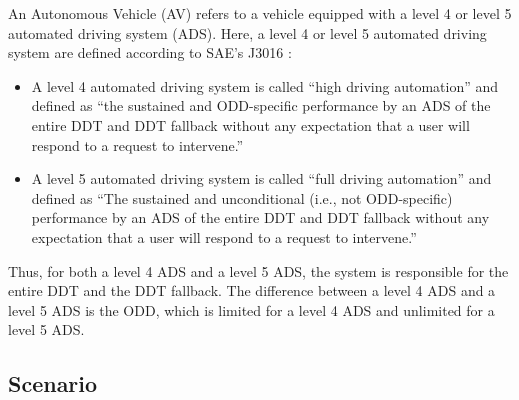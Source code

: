 An Autonomous Vehicle (AV) refers to a vehicle equipped with a level 4 or level 5 automated driving system (ADS). Here, a level 4 or level 5 automated driving system are defined according to SAE's J3016 \cite{sae2018j3016}:
\begin{itemize}
	\item A level 4 automated driving system is called ``high driving automation'' and defined as ``the sustained and ODD-specific performance by an ADS of the entire DDT and DDT fallback without any expectation that a user will respond to a request to intervene.''
	\item A level 5 automated driving system is called ``full driving automation'' and defined as ``The sustained and unconditional (i.e., not ODD-specific) performance by an ADS of the entire DDT and DDT fallback without any expectation that a user will respond to a request to intervene.''
\end{itemize}

Thus, for both a level 4 ADS and a level 5 ADS, the system is responsible for the entire DDT and the DDT fallback. The difference between a level 4 ADS and a level 5 ADS is the ODD, which is limited for a level 4 ADS and unlimited for a level 5 ADS.



\subsection{Scenario}

